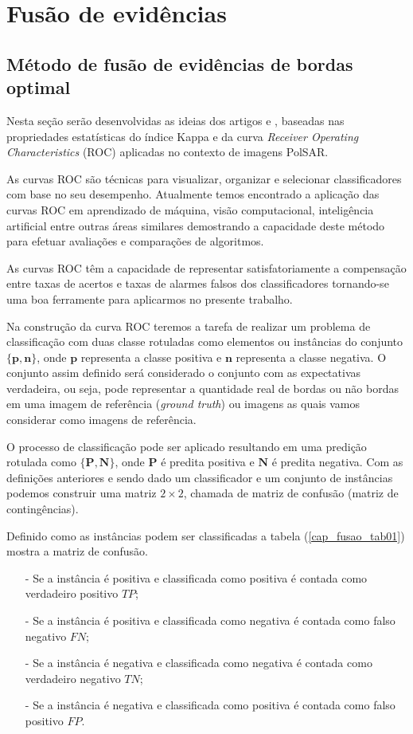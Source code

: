 \chapter{Fusão de evidências} \label{cap_fusao}

\section{Método de fusão de evidências de bordas optimal}

Nesta seção serão desenvolvidas as ideias dos artigos \citet{gs} e \citet{fawcett}, baseadas nas propriedades estatísticas do índice Kappa e da curva \textit{Receiver Operating Characteristics} (ROC) aplicadas no contexto de imagens PolSAR.


As curvas ROC são técnicas para visualizar, organizar e selecionar classificadores com base no seu desempenho.   Atualmente temos encontrado a aplicação das curvas ROC em aprendizado de máquina, visão computacional, inteligência artificial entre outras áreas similares demostrando a capacidade deste método para efetuar avaliações e comparações de algoritmos. 

As curvas ROC têm a capacidade de representar satisfatoriamente a compensação entre taxas de acertos e taxas de alarmes falsos dos classificadores tornando-se uma boa ferramente para aplicarmos no presente trabalho. 

Na construção da curva ROC  teremos a tarefa de realizar um problema de classificação com duas classe rotuladas como elementos ou instâncias do conjunto $\{\mathbf{p},\mathbf{n}\}$, onde $\mathbf{p}$ representa a classe positiva e $\mathbf{n}$ representa a classe negativa. O conjunto assim definido será considerado o conjunto com as expectativas verdadeira, ou seja, pode representar a quantidade real de bordas ou não bordas em uma imagem de referência (\textit{ground truth}) ou imagens as quais vamos considerar como imagens de referência.

O processo de classificação pode ser aplicado resultando em uma predição rotulada como $\{\mathbf{P},\mathbf{N}\}$, onde $\mathbf{P}$ é predita positiva e $\mathbf{N}$ é predita negativa. Com as definições anteriores e sendo dado um classificador e um conjunto de instâncias podemos construir uma matriz $2\times 2$, chamada de matriz de confusão (matriz de contingências). 


Definido como as instâncias podem ser classificadas a tabela (\ref{cap_fusao_tab01}) mostra a matriz de confusão.
\begin{itemize}
	\item [-] Se a instância é positiva e classificada como positiva é contada como verdadeiro positivo $TP$;
	\item [-] Se a instância é positiva e classificada como negativa é contada como falso negativo $FN$;
	\item [-] Se a instância é negativa e classificada como negativa é contada como verdadeiro negativo $TN$;
	\item [-] Se a instância é negativa e classificada como positiva é contada como falso positivo $FP$.
\end{itemize}


